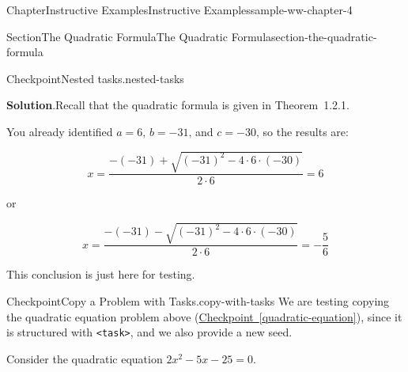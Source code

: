 \documentclass[oneside,10pt,]{book}
\newcommand{\blocktitlefont}{\relax}
\newcommand{\xreffont}{\relax}
\newcommand{\mono}[1]{\texttt{#1}}
\newlength{\fillinmaxwidth}
\newlength{\fillincontract}
\newlength{\charmaxwidth}\setlength{\charmaxwidth}{0.5em}
\newlength{\charminwidth}\setlength{\charminwidth}{0.1em}
\newlength{\fillinheight}
\newcommand{\fillintext}[1]{%
\setlength{\fillinmaxwidth}{#1\charmaxwidth}%
\setlength{\fillincontract}{#1\charminwidth}%
\setlength{\fillinheight}{\baselineskip}\addtolength{\fillinheight}{1.2pt}%
\strut\nobreak\leaders\vbox{\hrule width 0.3pt height 0.3pt \vskip -1.2pt}\hskip 1\fillinmaxwidth minus \fillincontract\nobreak\strut%
}
\newcommand{\lititle}[1]{{\slshape#1}}
\numberwithin{equation}{section}
\begin{document}
\begin{chapterptx}{Chapter}{Instructive Examples}{}{Instructive Examples}{}{}{sample-ww-chapter-4}
\begin{sectionptx}{Section}{The Quadratic Formula}{}{The Quadratic Formula}{}{}{section-the-quadratic-formula}
\begin{inlineexercise}{Checkpoint}{Nested tasks.}{nested-tasks}
\begin{enumerate}[font=\bfseries,label=(\alph*),ref=\alph*]
\noindent\textbf{\blocktitlefont Solution}.\hypertarget{nested-tasks-4-4}{}\quad{}Recall that the quadratic formula is given in Theorem~1.2.1.%
\par
You already identified \(a = {6}\text{,}\) \(b = {-31}\text{,}\) and \(c = {-30}\text{,}\) so the results are:%
\par
%
\begin{equation*}
x = {\frac{-\left(-31\right)+\sqrt{\left(-31\right)^{2}-4\cdot 6\cdot \left(-30\right)}}{2\cdot 6}} = {6}
\end{equation*}
%
\par
or%
\par
%
\begin{equation*}
x = {\frac{-\left(-31\right)-\sqrt{\left(-31\right)^{2}-4\cdot 6\cdot \left(-30\right)}}{2\cdot 6}} = {-{\frac{5}{6}}}
\end{equation*}
%
\end{enumerate}%
This conclusion is just here for testing.%
\end{inlineexercise}%
\begin{inlineexercise}{Checkpoint}{Copy a Problem with Tasks.}{copy-with-tasks}%
We are testing copying the quadratic equation problem above (\hyperref[quadratic-equation]{Checkpoint~{\xreffont\ref{quadratic-equation}}}), since it is structured with \mono{<task>}, and we also provide a new seed.%
 \par
Consider the quadratic equation \({2x^{2}-5x-25} = 0\text{.}\)%
\end{inlineexercise}
\end{sectionptx}
\end{chapterptx}
\end{document}
